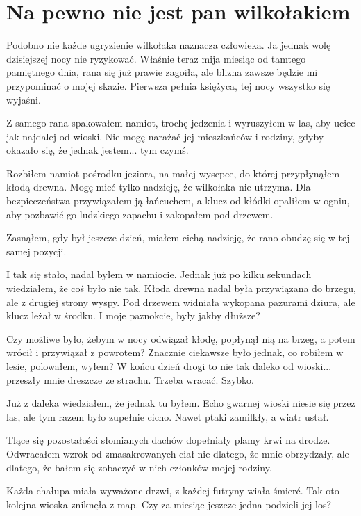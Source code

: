 \chapter{Na pewno nie jest pan wilkołakiem} 

Podobno nie każde ugryzienie wilkołaka naznacza człowieka.
Ja jednak wolę dzisiejszej nocy nie ryzykować.
Właśnie teraz mija miesiąc od tamtego pamiętnego dnia, rana się już prawie zagoiła, ale blizna zawsze będzie mi przypominać o mojej skazie.
Pierwsza pełnia księżyca, tej nocy wszystko się wyjaśni.

Z samego rana spakowałem namiot, trochę jedzenia i wyruszyłem w las, aby uciec jak najdalej od wioski.
Nie mogę narażać jej mieszkańców i rodziny, gdyby okazało się, że jednak jestem... tym czymś.

Rozbiłem namiot pośrodku jeziora, na małej wysepce, do której przypłynąłem kłodą drewna. 
Mogę mieć tylko nadzieję, że wilkołaka nie utrzyma.
Dla bezpieczeństwa przywiązałem ją łańcuchem, a klucz od kłódki opaliłem w ogniu, aby pozbawić go ludzkiego zapachu i zakopałem pod drzewem.

Zasnąłem, gdy był jeszcze dzień, miałem cichą nadzieję, że rano obudzę się w tej samej pozycji.

\divider{}
I tak się stało, nadal byłem w namiocie. Jednak już po kilku sekundach wiedziałem, że coś było nie tak.
Kłoda drewna nadal była przywiązana do brzegu, ale z drugiej strony wyspy.
Pod drzewem widniała wykopana pazurami dziura, ale klucz leżał w środku.
I moje paznokcie, były jakby dłuższe?

Czy możliwe było, żebym w nocy odwiązał kłodę, popłynął nią na brzeg, a potem wrócił i przywiązał z powrotem?
Znacznie ciekawsze było jednak, co robiłem w lesie, polowałem, wyłem? 
W końcu dzień drogi to nie tak daleko od wioski... przeszły mnie dreszcze ze strachu.
Trzeba wracać. Szybko.

\divider{}
Już z daleka wiedziałem, że jednak tu byłem.
Echo gwarnej wioski niesie się przez las, ale tym razem było zupełnie cicho.
Nawet ptaki zamilkły, a wiatr ustał.

Tlące się pozostałości słomianych dachów dopełniały plamy krwi na drodze.
Odwracałem wzrok od zmasakrowanych ciał nie dlatego, że mnie obrzydzały, ale dlatego, że bałem się zobaczyć w nich członków mojej rodziny.

Każda chałupa miała wyważone drzwi, z każdej futryny wiała śmierć.
Tak oto kolejna wioska zniknęła z map.
Czy za miesiąc jeszcze jedna podzieli jej los? 

